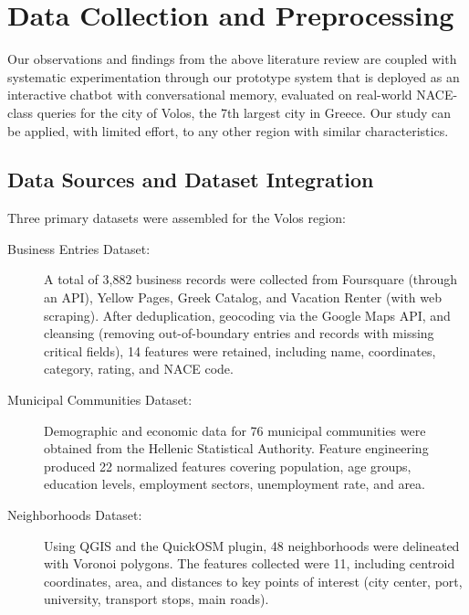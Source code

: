 \documentclass[pdflatex,sn-mathphys-num]{sn-jnl}%
\theoremstyle{thmstyleone}%
\theoremstyle{thmstyletwo}%
\theoremstyle{thmstylethree}%
\begin{document}
\section{Data Collection and Preprocessing} \label{sec:data}
Our observations and findings from the above literature review are coupled with systematic experimentation through
our prototype system that is deployed as an interactive chatbot with conversational memory, evaluated on real-world NACE-class queries for the city of Volos, the 7th largest city in Greece.
Our study can be applied, with limited effort, to any other region with similar characteristics.

\subsection{Data Sources and Dataset Integration}

Three primary datasets were assembled for the Volos region:

\begin{description}
    \item[Business Entries Dataset:] A total of 3,882 business records were collected from Foursquare (through an API), Yellow Pages, Greek Catalog, and Vacation Renter (with web scraping). After deduplication, geocoding via the Google Maps API, and cleansing (removing out-of-boundary entries and records with missing critical fields), 14 features were retained, including name, coordinates, category, rating, and NACE code.
    \item[Municipal Communities Dataset:] Demographic and economic data for 76 municipal communities were obtained from the Hellenic Statistical Authority. Feature engineering produced 22 normalized features covering population, age groups, education levels, employment sectors, unemployment rate, and area.
    \item[Neighborhoods Dataset:] Using QGIS and the QuickOSM plugin, 48 neighborhoods were delineated with Voronoi polygons. The features collected were 11, including centroid coordinates, area, and distances to key points of interest (city center, port, university, transport stops, main roads).
\end{description}

\end{document}
